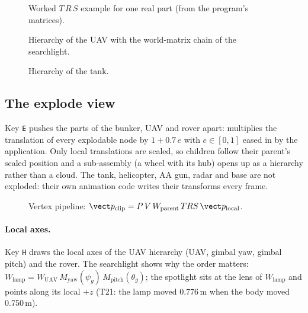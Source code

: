 \begin{figure}[h]
\centering
{}
\caption{Worked $T\,R\,S$ example for one real part (from the program's matrices).}
\end{figure}
\begin{figure}[h]
\centering
{}
\caption{Hierarchy of the UAV with the world-matrix chain of the searchlight.}
\end{figure}
\begin{figure}[h]
\centering
{}
\caption{Hierarchy of the tank.}
\end{figure}
\subsection{The explode view}
Key \texttt{E} pushes the parts of the bunker, UAV and rover apart:  multiplies the translation of every explodable node by $1+0.7\,e$ with $e\in[0,1]$ eased in by the
application. Only local translations are scaled, so children follow their parent's scaled position and a sub-assembly (a wheel with its hub) opens up as a hierarchy rather than
a cloud. The tank, helicopter, AA gun, radar and base are not exploded: their own animation code writes their transforms every frame.

\begin{figure}[h]
\centering
{}
\caption{Vertex pipeline: $\vect p_\text{clip}=P\,V\,W_\text{parent}\,T R S\,\vect p_\text{local}$.}
\label{fig:transform}
\end{figure}

\paragraph{Local axes.} Key \texttt{H} draws the local axes of the UAV hierarchy (UAV, gimbal yaw, gimbal pitch) and the
rover. The searchlight shows why the order matters:
$W_\text{lamp}=W_\text{UAV}\,M_\text{yaw}(\psi_g)\,M_\text{pitch}(\theta_g)$; the spotlight sits at the lens of
$W_\text{lamp}$ and points along its local $+z$ (T21: the lamp moved 0.776\,m when the body moved 0.750\,m).
